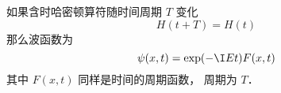 
如果含时哈密顿算符随时间周期 $T$ 变化
\begin{equation}
H(t+T) = H(t)
\end{equation}
那么波函数为
\begin{equation}
\psi(x, t) = \exp(-\I Et) F(x, t)
\end{equation}
其中 $F(x, t)$ 同样是时间的周期函数， 周期为 $T$．
